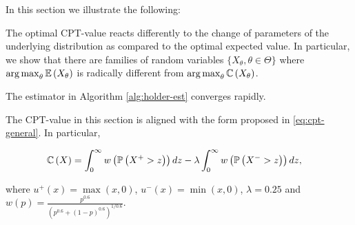 In this section we illustrate the following: \\
\begin{inparaenum}[\bfseries (i)]
\item The optimal CPT-value reacts differently to the change of parameters of the underlying distribution as compared to the optimal expected value. In particular, we show that there are families of random variables $\{X_\theta, \theta \in \Theta\}$ where $\mathop{\rm arg\,max}_{\theta} \mathbb{E}\left( X_\theta \right)$ is radically different from 
$\mathop{\rm arg\,max}_{\theta} \mathbb{C} \left( X_\theta \right)$. \\
\item The estimator in Algorithm \ref{alg:holder-est} converges rapidly.
\end{inparaenum}

The CPT-value in this section is aligned with the form proposed in \eqref{eq:cpt-general}. In particular,
\begin{small}
\begin{align*}
\mathbb{C}\left(X\right) &= \int_0^{\infty} w\left(\mathbb{P}\left( X^+>z \right)\right) dz - \lambda \int_0^{\infty} w\left(\mathbb{P}\left( X^->z \right)\right) dz, 
\end{align*}
\end{small}
where $u^+(x) = \max(x,0)$, $u^-(x) = \min(x,0)$, $\lambda = 0.25$ and
$w(p) = \frac{p^{0.6}}{(p^{0.6} + (1-p)^{0.6})^{1/0.6}}.$ 

